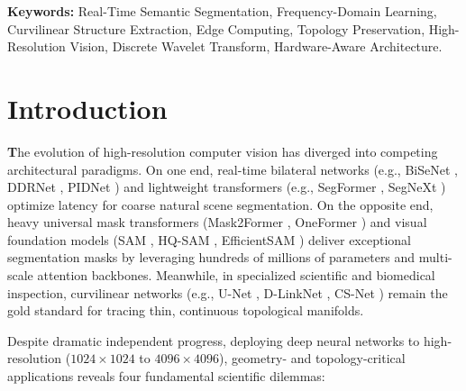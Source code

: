 \documentclass[11pt,a4paper]{article}
\providecommand{\IEEEPARstart}[2]{\textbf{#1}#2}
\newenvironment{IEEEkeywords}{\par\vspace{0.8em}\noindent\textbf{Keywords:}\enspace}{\par\vspace{1.2em}}
\begin{document}
\begin{IEEEkeywords}
Real-Time Semantic Segmentation, Frequency-Domain Learning, Curvilinear Structure Extraction, Edge Computing, Topology Preservation, High-Resolution Vision, Discrete Wavelet Transform, Hardware-Aware Architecture.
\end{IEEEkeywords}

\section{Introduction}

\IEEEPARstart{T}{he} evolution of high-resolution computer vision has diverged into competing architectural paradigms. On one end, real-time bilateral networks (e.g., BiSeNet \cite{yu2021bisenet}, DDRNet \cite{hong2021deep}, PIDNet \cite{xu2023pidnet}) and lightweight transformers (e.g., SegFormer \cite{xie2021segformer}, SegNeXt \cite{guo2022segnext}) optimize latency for coarse natural scene segmentation. On the opposite end, heavy universal mask transformers (Mask2Former \cite{cheng2022masked}, OneFormer \cite{jain2023oneformer}) and visual foundation models (SAM \cite{kirillov2023segment}, HQ-SAM \cite{ke2023hqsam}, EfficientSAM \cite{xiong2024efficientsam}) deliver exceptional segmentation masks by leveraging hundreds of millions of parameters and multi-scale attention backbones. Meanwhile, in specialized scientific and biomedical inspection, curvilinear networks (e.g., U-Net \cite{ronneberger2015u}, D-LinkNet \cite{zhou2018dlinknet}, CS-Net \cite{mou2019csnet}) remain the gold standard for tracing thin, continuous topological manifolds.

Despite dramatic independent progress, deploying deep neural networks to high-resolution ($1024\times 1024$ to $4096\times 4096$), geometry- and topology-critical applications reveals four fundamental scientific dilemmas:
\end{document}
